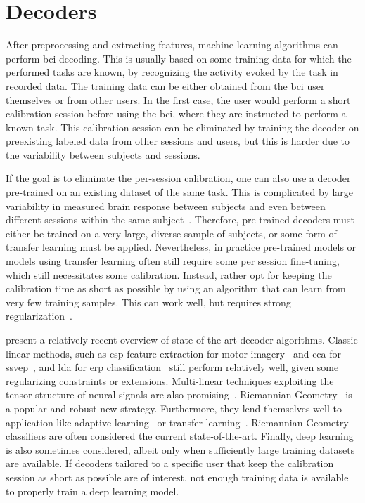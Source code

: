 \section{Decoders}
\label{sec:bci/decoding}

After preprocessing and extracting features, machine learning algorithms can perform \ac{bci}
decoding.
This is usually based on
some training data for which the performed tasks are known, by recognizing the
activity evoked by the task in recorded data.
The training data can be either obtained from the \ac{bci} user themselves or from
other users.
In the first case, the user would perform a short calibration session before
using the \ac{bci}, where they are instructed to perform a known task.
This calibration session can be eliminated by training the decoder on
preexisting labeled data from other sessions and users, but this is harder due
to the variability between subjects and sessions.


If the goal is to eliminate the per-session calibration, one can also use a
decoder pre-trained on an existing dataset of the same task.
This is complicated by large variability in measured brain response between subjects
and even between different sessions within the same
subject~\cite{Guger2009,Saha2020}.
Therefore, pre-trained decoders must either be trained on a very large, diverse
sample of subjects, or some form of transfer learning must be applied.
Nevertheless, in practice pre-trained models or models using transfer learning often still
require some per session fine-tuning, which still necessitates some
calibration.
Instead, rather opt for keeping the calibration time as short as possible by using
an algorithm that can learn from very few training samples.
This can work well, but requires strong regularization~\cite{VanDenKerchove2022}.

\textcite{Lotte2018, Xu2021} present a relatively recent overview of state-of-the art
decoder algorithms.
Classic linear methods, such as \ac{csp} feature extraction for
motor imagery~\cite{Park2017} and \ac{cca} for \ac{ssvep}~\cite{Nakanishi2017},
and \ac{lda} for \ac{erp} classification~\cite{Sosulski2022} still perform
relatively well, given some regularizing constraints or extensions.
Multi-linear techniques exploiting the tensor structure of neural signals are
also promising~\cite{Lotte2018}.
Riemannian Geometry~\cite{Barachant2014} is a popular and robust new strategy.
Furthermore, they lend themselves well to application like adaptive
learning~\cite{Benaroch2021} or transfer learning~\cite{Zanini2017}.
Riemannian Geometry classifiers are often considered the current
state-of-the-art.
Finally, deep learning~\cite{Bhuvaneshwari2021} is also sometimes considered,
albeit only when sufficiently large training datasets are available.
If decoders tailored to a specific user that keep the calibration session as
short as possible are of interest, not enough training data is available to
properly train a deep learning model.

